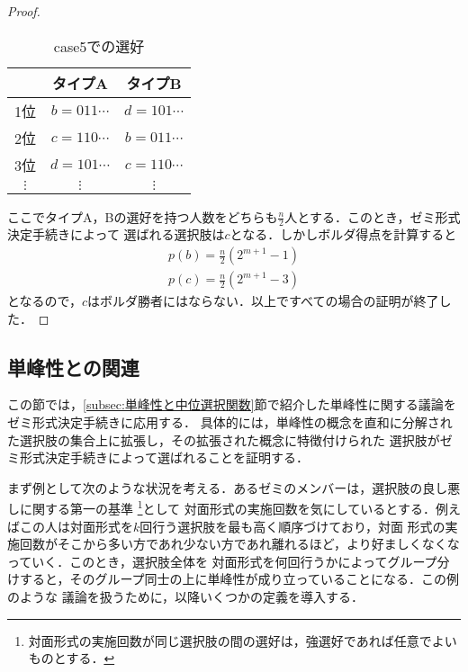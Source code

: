 \documentclass[dvipdfmx]{jsarticle}
\begin{document}
\begin{proof}
  \begin{table}[h]
    \caption{case5での選好}\label{tab:case5}
    \begin{center}
      \begin{tabular}{c|c|c}\hline
          & タイプA & タイプB \\ \hline
        1位 & $b = 011\cdots$ & $d = 101\cdots$ \\
        2位 & $c = 110\cdots$ & $b = 011\cdots$ \\
        3位 & $d = 101\cdots$ & $c = 110\cdots$ \\
        $\vdots$ & $\vdots$ & $\vdots$ \\ \hline
      \end{tabular}
    \end{center}
  \end{table}

  \noindent{}ここでタイプA，Bの選好を持つ人数をどちらも$\frac{n}{2}$人とする．このとき，ゼミ形式決定手続きによって
  選ばれる選択肢は$c$となる．しかしボルダ得点を計算すると
  \begin{gather*}
    p(b) = \frac{n}{2}(2^{m+1}-1) \\
    p(c) = \frac{n}{2}(2^{m+1}-3)
  \end{gather*}
  となるので，$c$はボルダ勝者にはならない．以上ですべての場合の証明が終了した．
\end{proof}

\subsection{単峰性との関連}\label{subsec:単峰性との関連}
  この節では，\ref{subsec:単峰性と中位選択関数}節で紹介した単峰性に関する議論をゼミ形式決定手続きに応用する．
  具体的には，単峰性の概念を直和に分解された選択肢の集合上に拡張し，その拡張された概念に特徴付けられた
  選択肢がゼミ形式決定手続きによって選ばれることを証明する．

  まず例として次のような状況を考える．あるゼミのメンバーは，選択肢の良し悪しに関する第一の基準
  \footnote{対面形式の実施回数が同じ選択肢の間の選好は，強選好であれば任意でよいものとする．}として
  対面形式の実施回数を気にしているとする．例えばこの人は対面形式を$k$回行う選択肢を最も高く順序づけており，対面
  形式の実施回数がそこから多い方であれ少ない方であれ離れるほど，より好ましくなくなっていく．このとき，選択肢全体を
  対面形式を何回行うかによってグループ分けすると，そのグループ同士の上に単峰性が成り立っていることになる．この例のような
  議論を扱うために，以降いくつかの定義を導入する．
\end{document}
